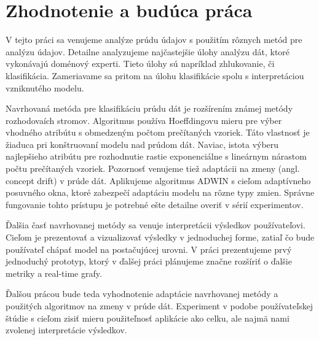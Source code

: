 \chapter{Zhodnotenie a budúca práca}
\label{Zhodnotenie a budúca práca}

V tejto práci sa venujeme analýze prúdu údajov s použitím rôznych metód pre analýzu údajov. Detailne analyzujeme najčastejšie úlohy analýzu dát, ktoré vykonávajú doménový experti. Tieto úlohy sú napríklad zhlukovanie, či klasifikácia. Zameriavame sa pritom na úlohu klasifikácie spolu s interpretáciou vzniknutého modelu. 
\par
Navrhovaná metóda pre klasifikáciu prúdu dát je rozšírením známej metódy rozhodovaích stromov. Algoritmus používa Hoeffdingovu mieru pre výber vhodného atribútu s obmedzeným počtom prečítaných vzoriek. Táto vlastnosť je žiaduca pri konštruovaní modelu nad prúdom dát. Naviac, istota výberu najlepšieho atribútu pre rozhodnutie rastie exponenciálne s lineárnym nárastom počtu prečítaných vzoriek. Pozornosť venujeme tiež adaptácii na zmeny (angl. concept drift) v prúde dát. Aplikujeme algoritmus ADWIN s cieľom adaptívneho posuvného okna, ktoré zabezpečí adaptáciu modelu na rôzne typy zmien. Správne fungovanie tohto prístupu je potrebné ešte detailne overiť v sérií experimentov.
\par
Ďalšia časť navrhovanej metódy sa venuje interpretácii výsledkov používateľovi. Cieľom je prezentovať a vizualizovať výsledky v jednoduchej forme, zatiaľ čo bude používateľ chápať model na postačujúcej urovni. V práci prezentujeme prvý jednoduchý prototyp, ktorý v ďalšej práci plánujeme značne rozšíriť o ďalšie metriky a real-time grafy.
\par
Ďalšou prácou bude teda vyhodnotenie adaptácie navrhovanej metódy a použitých algoritmov na zmeny v prúde dát. Experiment v podobe používateľskej štúdie s cieľom zisiť mieru použiteľnosť aplikácie ako celku, ale najmä nami zvolenej interpretácie výsledkov.